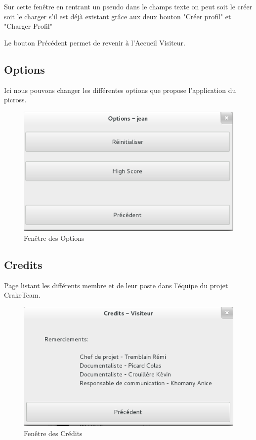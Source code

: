 \documentclass[11pt]{article}
\begin{document}
Sur cette fenêtre en rentrant un pseudo dans le champs texte on peut soit le créer soit le charger s'il est déjà existant grâce aux deux bouton "Créer profil" et "Charger Profil"

Le bouton Précédent permet de revenir à l'Accueil Visiteur.	

\subsection{Options}

Ici nous pouvons changer les différentes options que propose l'application du picross.

	\begin{figure}[!ht]
		\centering
		\includegraphics{./Screenshot/Options.png}
		\caption{Fenêtre des Options}
	\end{figure}


\subsection{Credits}

Page listant les différents membre et de leur poste dans l'équipe du projet CrakeTeam.

	\begin{figure}[!ht]
		\centering
		\includegraphics{./Screenshot/Credits.png}
		\caption{Fenêtre des Crédits}
	\end{figure}
\end{document}
